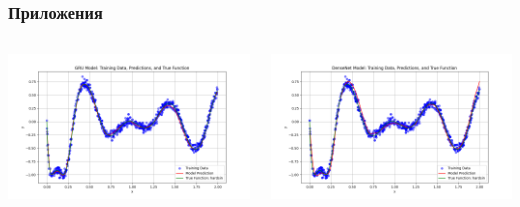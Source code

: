\documentclass
  [ russian
  , aspectratio=1610 %
  ] {beamer}
\begin{document}
\begin{frame}
\frametitle{Приложения}
    \begin{columns}
        \begin{column}{0.5\textwidth}
            \centering
            \includegraphics[width=1.1\textwidth]{figures/hardsin_500eph_gru_apr_plot.png}
        \end{column}
        \begin{column}{0.5\textwidth}
            \centering
            \includegraphics[width=1.1\textwidth]{figures/hardsin_500eph_dense_apr_plot.png}
        \end{column}
    \end{columns}
\end{frame}
\end{document}
